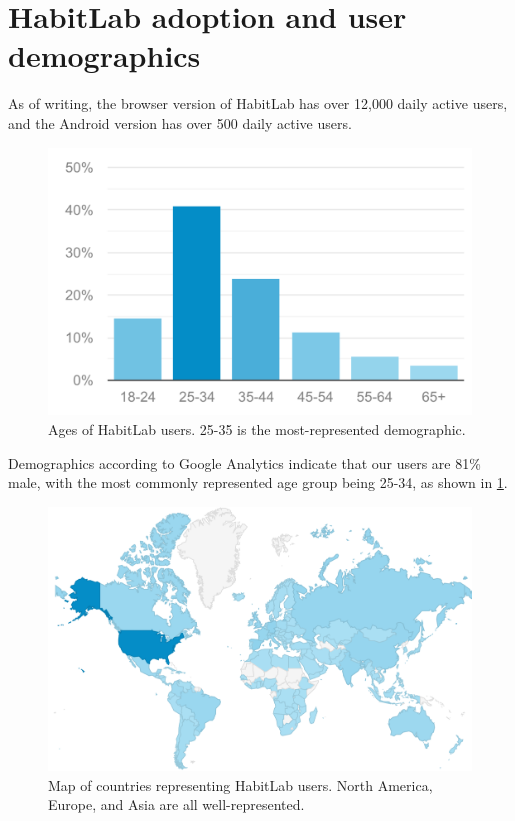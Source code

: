 \section{HabitLab adoption and user demographics}

As of writing, the browser version of HabitLab has over 12,000 daily active users, and the Android version has over 500 daily active users.

\begin{figure}
	\includegraphics[width=1.0\textwidth]{figuresS/user_ages.png}
	\caption{Ages of HabitLab users. 25-35 is the most-represented demographic.}
\label{fig:user_ages}
\end{figure}

Demographics according to Google Analytics indicate that our users are 81\% male, with the most commonly represented age group being 25-34, as shown in \ref{fig:user_ages}.

\begin{figure}
	\includegraphics[width=1.0\textwidth]{figuresS/user_map.png}
	\caption{Map of countries representing HabitLab users. North America, Europe, and Asia are all well-represented.}
\label{fig:user_map}
\end{figure}


